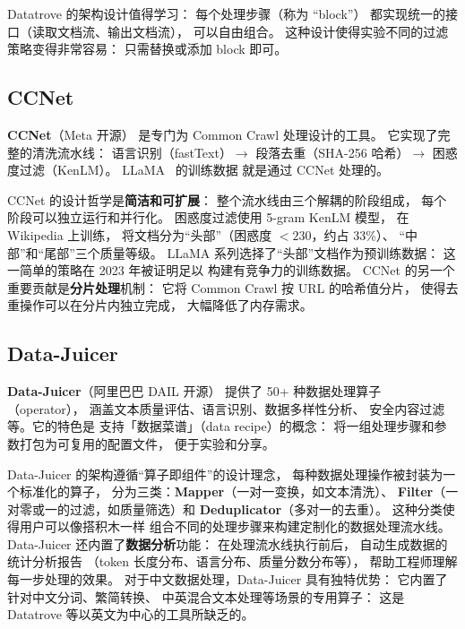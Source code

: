 Datatrove 的架构设计值得学习：
每个处理步骤（称为 “block”）
都实现统一的接口（读取文档流、输出文档流），
可以自由组合。
这种设计使得实验不同的过滤策略变得非常容易：
只需替换或添加 block 即可。

\subsection{CCNet}

\textbf{CCNet}（Meta 开源）
是专门为 Common Crawl 处理设计的工具。
它实现了完整的清洗流水线：
语言识别（fastText）$\to$
段落去重（SHA-256 哈希）$\to$
困惑度过滤（KenLM）。
LLaMA~\cite{touvron2023llama} 的训练数据
就是通过 CCNet 处理的。

CCNet 的设计哲学是\textbf{简洁和可扩展}：
整个流水线由三个解耦的阶段组成，
每个阶段可以独立运行和并行化。
困惑度过滤使用 5-gram KenLM 模型，
在 Wikipedia 上训练，
将文档分为“头部”（困惑度 $< 230$，约占 33\%）、
“中部”和“尾部”三个质量等级。
LLaMA 系列选择了“头部”文档作为预训练数据：
这一简单的策略在 2023 年被证明足以
构建有竞争力的训练数据。
CCNet 的另一个重要贡献是\textbf{分片处理}机制：
它将 Common Crawl 按 URL 的哈希值分片，
使得去重操作可以在分片内独立完成，
大幅降低了内存需求。

\subsection{Data-Juicer}

\textbf{Data-Juicer}（阿里巴巴 DAIL 开源）
提供了 50+ 种数据处理算子（operator），
涵盖文本质量评估、语言识别、数据多样性分析、
安全内容过滤等。它的特色是
支持「数据菜谱」（data recipe）的概念：
将一组处理步骤和参数打包为可复用的配置文件，
便于实验和分享。

Data-Juicer 的架构遵循“算子即组件”的设计理念，
每种数据处理操作被封装为一个标准化的算子，
分为三类：\textbf{Mapper}（一对一变换，如文本清洗）、
\textbf{Filter}（一对零或一的过滤，如质量筛选）和
\textbf{Deduplicator}（多对一的去重）。
这种分类使得用户可以像搭积木一样
组合不同的处理步骤来构建定制化的数据处理流水线。
Data-Juicer 还内置了\textbf{数据分析}功能：
在处理流水线执行前后，
自动生成数据的统计分析报告
（token 长度分布、语言分布、质量分数分布等），
帮助工程师理解每一步处理的效果。
对于中文数据处理，Data-Juicer 具有独特优势：
它内置了针对中文分词、繁简转换、
中英混合文本处理等场景的专用算子：
这是 Datatrove 等以英文为中心的工具所缺乏的。

